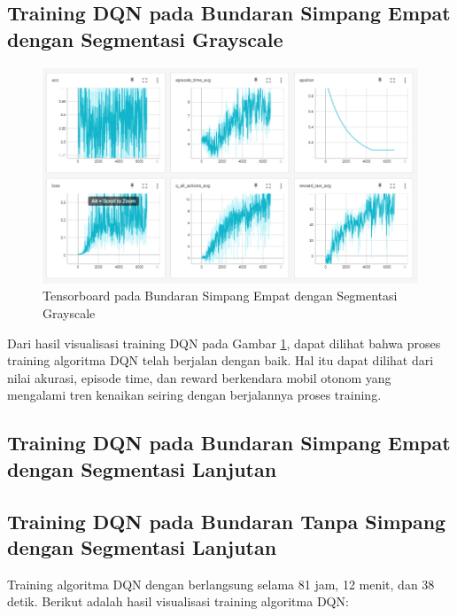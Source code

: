 \subsection{Training DQN pada Bundaran Simpang Empat dengan Segmentasi Grayscale}
\label{sec:training_dqn_bundaran_simpangempat_segmentasi_grayscale}

\begin{figure}[H] 
	\centering
	\includegraphics[width=1\linewidth]{images/tensorboard_bundaran_simpangempat_segmentasi_grayscale}
	\caption{Tensorboard pada Bundaran Simpang Empat dengan Segmentasi Grayscale}
	\label{fig:tensorboard_bundaran_simpangempat_segmentasi_grayscale}
\end{figure}

Dari hasil visualisasi training DQN pada Gambar \ref{fig:tensorboard_bundaran_simpangempat_segmentasi_grayscale}, dapat dilihat bahwa proses training algoritma DQN telah berjalan dengan baik. Hal itu dapat dilihat dari nilai akurasi, episode time, dan reward berkendara mobil otonom yang mengalami tren kenaikan seiring dengan berjalannya proses training.

\subsection{Training DQN pada Bundaran Simpang Empat dengan Segmentasi Lanjutan}
\label{sec:training_dqn_bundaran_simpangempat_segmentasi_hitam_putih}

\subsection{Training DQN pada Bundaran Tanpa Simpang dengan Segmentasi Lanjutan}
\label{sec:training_dqn_bundaran_nosimpang_segmentasi_hitam_putih}

\iffalse
Training algoritma DQN dengan
berlangsung selama 81 jam, 12 menit, dan 38 detik. Berikut adalah hasil visualisasi training algoritma DQN:

